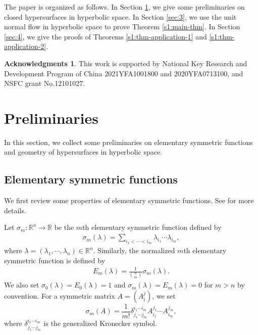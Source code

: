 \documentclass[11pt,reqno]{amsart}
\theoremstyle{definition}
\newtheorem*{ack}{Acknowledgments}
\theoremstyle{remark}
\numberwithin{equation}{section}
\renewcommand{\(}{\left(}
\renewcommand{\)}{\right)}
\renewcommand{\~}{\widetilde}
\renewcommand{\-}{\overline}
\renewcommand{\d}{\delta}
\renewcommand{\l}{\lambda}
\newcommand{\s}{\sigma}
\renewcommand{\l}{\lambda}
\newcommand{\ra}{\rightarrow}
\begin{document}
The paper is organized as follows. In Section \ref{sec:2}, we give some preliminaries on closed hypersurfaces in hyperbolic space. In Section \ref{sec:3}, we use the unit normal flow in hyperbolic space to prove Theorem \ref{s1:main-thm}. In Section \ref{sec:4}, we give the proofs of Theorems \ref{s1:thm-application-1} and \ref{s1:thm-application-2}.

\begin{ack}
   This work is supported by National Key Research and Development Program of China 2021YFA1001800 and 2020YFA0713100, and NSFC grant No.12101027.
\end{ack}

\section{Preliminaries}\label{sec:2}
In this section, we collect some preliminaries on elementary symmetric functions and geometry of hypersurfaces in hyperbolic space.


\subsection{Elementary symmetric functions}
We first review some properties of elementary symmetric functions. See \cite{Guan14} for more details.

Let $\s_m:\mathbb R^n \ra \mathbb R$ be the $m$th elementary symmetric function defined by
\begin{align*}
\s_m(\l)=\sum_{i_1<\cdots<i_m} \l_{i_1} \cdots \l_{i_m},
\end{align*}
where $\l=(\l_1,\cdots,\l_n)\in \mathbb R^n$. Similarly, the normalized $m$th elementary symmetric function is defined by
\begin{align*}
E_m(\l)=\frac{1}{\binom{n}{m}}\s_m(\l).
\end{align*}
We also set $\s_0(\l)=E_0(\l)=1$ and $\s_m(\l)=E_m(\l)=0$ for $m>n$ by convention. For a symmetric matrix $A=(A_i^j)$, we set
$$
\s_m(A)=\frac{1}{m!}\d_{j_1\cdots j_m}^{i_1\cdots i_m} A_{i_1}^{j_1}\cdots  A_{i_m}^{j_m},
$$
where $\d_{j_1\cdots j_m}^{i_1\cdots i_m}$ is the generalized Kronecker symbol.
\end{document}

